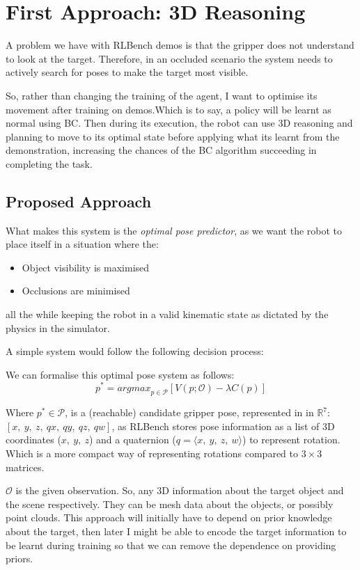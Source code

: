 \section{First Approach: 3D Reasoning}\label{sec:appl-1}
A problem we have with RLBench demos is that the gripper does not understand to look at the target. Therefore, in an occluded scenario the system needs to actively search for poses to make the target most visible.

So, rather than changing the training of the agent, I want to optimise its movement after training on demos.Which is to say, a policy will be learnt as normal using BC. Then during its execution, the robot can use 3D reasoning and  planning to move to its optimal state before applying what its learnt from the demonstration, increasing the chances of the BC algorithm succeeding in completing the task.

\subsection{Proposed Approach}\label{subsec:appl-first-proposed}
What makes this system is the \emph{optimal pose predictor}, as we want the robot to place itself in a situation where the:
\begin{itemize}
  \item Object visibility is maximised
  \item Occlusions are minimised
\end{itemize}
all the while keeping the robot in a valid kinematic state as dictated by the physics in the simulator.


A simple system would follow the following decision process:

We can formalise this optimal pose system as follows:
\[
p^* = {argmax}_{p \in \mathcal{P}}
  \left[
    V \left( p; \mathcal{O} \right)
    - 
    \lambda C\left( p \right)
  \right]
\]

Where \(p^* \in \mathcal{P}\), is a (reachable) candidate gripper pose, represented in in \(\mathbb{R}^7\): \( \left[ x, ~y, ~z, ~qx, ~qy, ~qz, ~qw\right]\), as RLBench stores pose information as a list of 3D coordinates (\(x, ~y, ~z\)) and a quaternion (\(q = \langle x, ~y, ~z, ~w \rangle \)) to represent rotation. Which is a more compact way of representing rotations compared to $3\times3$ matrices.

$\mathcal{O}$ is the given observation. So, any  3D information about the target object and the scene respectively. They can be mesh data about the objects, or possibly point clouds. This approach will initially have to depend on prior knowledge about the target, then later I might be able to encode the target information to be learnt during training so that we can remove the dependence on providing priors.

